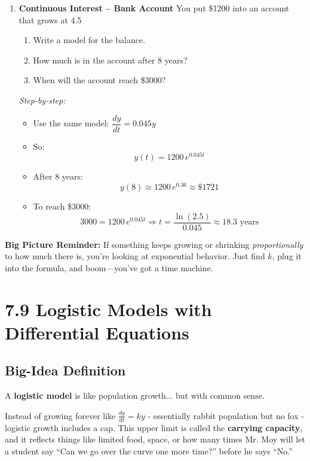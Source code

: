 \documentclass{article}
\begin{document}
\begin{enumerate}
\bigskip
\item \textbf{Continuous Interest – Bank Account}
You put \$1200 into an account that grows at 4.5%

\begin{enumerate}[label=\alph*)]
  \item Write a model for the balance.
  \item How much is in the account after 8 years?
  \item When will the account reach \$3000?
\end{enumerate}

\textit{Step-by-step:}
\begin{itemize}
  \item Use the same model: \(\dfrac{dy}{dt} = 0.045 y\)
  \item So:
  \[
  \boxed{y(t) = 1200\,e^{0.045t}}
  \]
  \item After 8 years:
  \[
  y(8) \approx 1200\,e^{0.36} \approx \$1721
  \]
  \item To reach \$3000:
  \[
  3000 = 1200\,e^{0.045t} \Rightarrow t = \frac{\ln(2.5)}{0.045} \approx 18.3 \text{ years}
  \]
\end{itemize}
\end{enumerate}

\noindent
\textbf{Big Picture Reminder:}  
If something keeps growing or shrinking \emph{proportionally} to how much there is, you're looking at exponential behavior. Just find \(k\), plug it into the formula, and boom—you’ve got a time machine.





\newpage

\section{7.9 Logistic Models with Differential Equations}

\subsection*{Big-Idea Definition}
A \textbf{logistic model} is like population growth... but with common sense.

Instead of growing forever like \( \frac{dy}{dt} = ky \) - essentially rabbit population but no fox -  logistic growth includes a cap. This upper limit is called the \textbf{carrying capacity}, and it reflects things like limited food, space, or how many times Mr. Moy will let a student say “Can we go over the curve one more time?” before he says “No.”
\end{document}
